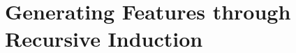\documentclass[twoside,11pt]{article}
\theoremstyle{definition}
\begin{document}




\section{Generating Features through Recursive Induction} \label{formal}
\end{document}
